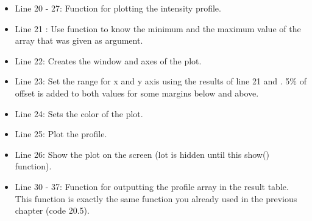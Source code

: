 \begin{itemize}
\item Line 20 - 27: Function for plotting the intensity profile.
\item Line 21 : Use  function to know the minimum and
the maximum value of the array that was given as argument.
\item Line 22: Creates the window and axes of the plot. 
\item Line 23: Set the range for x and y axis using the results of line 21
 and . 5\% of offset is added to both values for some
margins below and above.
\item Line 24: Sets the color of the plot. 
\item Line 25: Plot the profile. 
\item Line 26: Show the plot on the screen (lot is hidden until this show()
function).

\item Line 30 - 37: Function for outputting the profile array in the result
table. This function is exactly the same function you already used in the
previous chapter (code 20.5).

\end{itemize}
